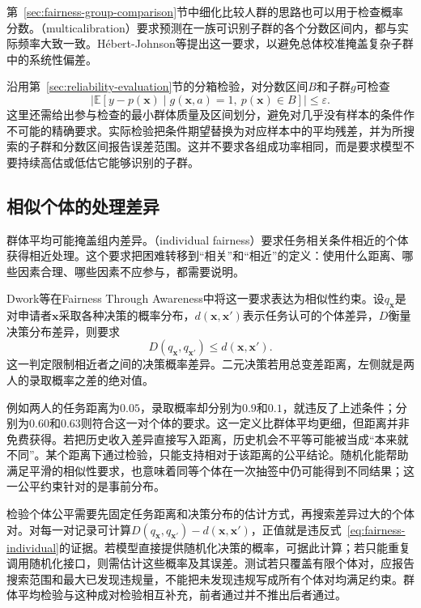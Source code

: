 第~\ref{sec:fairness-group-comparison}节中细化比较人群的思路也可以用于检查概率分数。（multicalibration）要求预测在一族可识别子群的各个分数区间内，都与实际频率大致一致。Hébert-Johnson等提出这一要求，以避免总体校准掩盖复杂子群中的系统性偏差。

沿用第~\ref{sec:reliability-evaluation}节的分箱检验，对分数区间$B$和子群$g$可检查
\begin{equation}
 \left|\mathbb E[y-p(\bm{x})\mid
       g(\bm{x},a)=1,\ p(\bm{x})\in B]\right|
 \leq\varepsilon.
 \label{eq:fairness-multicalibration}
\end{equation}
这里还需给出参与检查的最小群体质量及区间划分，避免对几乎没有样本的条件作不可能的精确要求。实际检验把条件期望替换为对应样本中的平均残差，并为所搜索的子群和分数区间报告误差范围。这并不要求各组成功率相同，而是要求模型不要持续高估或低估它能够识别的子群。

\subsection{相似个体的处理差异}
\label{sec:fairness-individual-comparison}

群体平均可能掩盖组内差异。（individual fairness）要求任务相关条件相近的个体获得相近处理。这个要求把困难转移到“相关”和“相近”的定义：使用什么距离、哪些因素合理、哪些因素不应参与，都需要说明。

Dwork等在Fairness Through Awareness中将这一要求表达为相似性约束。设$q_{\bm{x}}$是对申请者$\bm{x}$采取各种决策的概率分布，$d(\bm{x},\bm{x}')$表示任务认可的个体差异，$D$衡量决策分布差异，则要求
\begin{equation}
 D(q_{\bm{x}},q_{\bm{x}'})\leq d(\bm{x},\bm{x}').
 \label{eq:fairness-individual}
\end{equation}
这一判定限制相近者之间的决策概率差异。二元决策若用总变差距离，左侧就是两人的录取概率之差的绝对值。

例如两人的任务距离为$0.05$，录取概率却分别为$0.9$和$0.1$，就违反了上述条件；分别为$0.60$和$0.63$则符合这一对个体的要求。这一定义比群体平均更细，但距离并非免费获得。若把历史收入差异直接写入距离，历史机会不平等可能被当成“本来就不同”。某个距离下通过检验，只能支持相对于该距离的公平结论。随机化能帮助满足平滑的相似性要求，也意味着同等个体在一次抽签中仍可能得到不同结果；这一公平约束针对的是事前分布。

检验个体公平需要先固定任务距离和决策分布的估计方式，再搜索差异过大的个体对。对每一对记录可计算$D(q_{\bm{x}},q_{\bm{x}'})-d(\bm{x},\bm{x}')$，正值就是违反式~\eqref{eq:fairness-individual}的证据。若模型直接提供随机化决策的概率，可据此计算；若只能重复调用随机化接口，则需估计这些概率及其误差。测试若只覆盖有限个体对，应报告搜索范围和最大已发现违规量，不能把未发现违规写成所有个体对均满足约束。群体平均检验与这种成对检验相互补充，前者通过并不推出后者通过。

